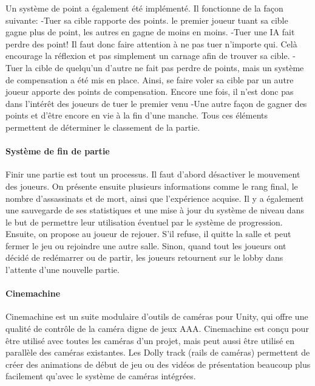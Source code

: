 			Un système de point a également été implémenté. Il fonctionne de la façon suivante:
				-Tuer sa cible rapporte des points. le premier joueur tuant sa cible gagne plus de point, les autres en gagne de moins en moins.
				-Tuer une IA fait perdre des point! Il faut donc faire attention à ne pas tuer n'importe qui. Celà encourage la réflexion et pas simplement un carnage afin de trouver sa cible.
				-Tuer la cible de quelqu'un d'autre ne fait pas perdre de points, mais un système de compensation a été mis en place. Ainsi, se faire voler sa cible par un autre joueur apporte des points de compensation. Encore une fois, il n'est donc pas dans l'intérêt 
				des joueurs de tuer le premier venu
				-Une autre façon de gagner des points et d'être encore en vie à la fin d'une manche.
			Tous ces éléments permettent de déterminer le classement de la partie.
	

		\paragraph{Système de fin de partie}

			Finir une partie est tout un processus. Il faut d'abord désactiver le mouvement des joueurs.
			On présente ensuite plusieurs informations comme le rang final, le nombre d'assassinats
			et de mort, ainsi que l'expérience acquise. Il y a également une sauvegarde de ses statistiques et une mise à jour du système
			de niveau dans le but de permettre leur utilisation éventuel par le système de progression.
			Ensuite, on propose au joueur de rejouer. S'il refuse, il quitte la salle et peut fermer le jeu ou rejoindre une autre salle.
			Sinon, quand tout les joueurs ont décidé de redémarrer ou de partir, les joueurs retournent 
			sur le lobby dans l'attente d'une nouvelle partie.


		\paragraph{Cinemachine}

			Cinemachine est un suite modulaire d'outils de caméras pour Unity, qui offre 
			une qualité de contrôle de la caméra digne de jeux AAA. Cinemachine est conçu pour être utilisé 
			avec toutes les caméras d'un projet, mais peut aussi être utilisé en parallèle des caméras existantes. 
			Les Dolly track (rails de caméras) permettent de créer des animations de début de jeu ou 
			des vidéos de présentation beaucoup plus facilement qu'avec le système de caméras intégrées. 

